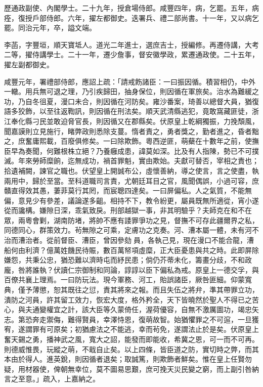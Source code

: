 \begin{pinyinscope}
歷通政副使、內閣學士。二十九年，授倉場侍郎。咸豐四年，病，乞罷。五年，病痊，復授戶部侍郎。六年，擢左都御史。迭署兵、禮二部尚書。十一年，又以病乞罷。同治元年，卒，謚文端。

李菡，字豐垣，順天寶坻人。道光二年進士，選庶吉士，授編修。再遷侍講，大考二等，擢侍講學士。二十一年，遷少詹事，督安徽學政，累遷通政使。二十五年，擢左副都御史。

咸豐元年，署禮部侍郎，應詔上疏：「請戒飭諸臣：一曰振因循。積習相仍，中外一轍。用兵無可退之理，乃引疾歸田，抽身保位，則因循在軍旅矣。治水為難緩之功，乃自冬徂夏，漫口未合，則因循在河防矣。雍沙番案，琦善以總督大員，猶復語多狡飾，以至往返鞫訊，則因循在刑法矣。順天武清縣逃犯，竟敢窩藏匪徒，浙江奉化縣刁民並敢迫脅官長，則因循又在郡縣矣。伏原皇上乾綱獨振，力挽頹風，聞嘉謨則立見施行，睹弊政則悉除支蔓。惰者責之，勇者獎之，勤者進之，昏者黜之，庶奮庸熙載，百廢俱修矣。一曰除欺飾。粵西逆匪，萌蘗在十數年之前，使撫臣早為奏聞，何難根株立絕？乃養癰成患，諱莫如深。比及有人指陳，勢已不可撲滅。年來勞師糜餉，迄無成功，禍首罪魁，實由欺始。夫獻可替否，宰相之責也；拾遺補闕，諫官之職也。伏望皇上開誠布公，虛懷善納，導之使言，言之使盡，執兩用中，歸於至當。至科道職司言責，尤朝廷耳目之官，風聞偶誤，小過可容，庶贛直得效其愚，萋菲莫行其罔，而宸聰四達矣。一曰屏偏私。人之氣質，不能無偏，意見少有參差，議論遂多齟。相持不下，教令紛更，屬員既無所適從，宵小遂從而讒構。嫌隙日深，乖氣致戾。刑部越獄一事，非其明驗乎？夫師克在和不在眾，兩粵會剿，湖南防堵，將帥不應有諉罪爭功之見，督撫不可存此疆爾界之私，同德同心，群策效力。茍無隙之可乘，定膚功之克奏。河、漕本屬一體，未有河不治而漕治者。從前督臣、漕臣，曾因參劾員，各執己見，現在漫口不能合龍，漕船何由利濟？億萬姓饑民待賑，數百萬帑項虛糜，正大臣憂患與共之時。此即屏除嫌怨，共秉公忠，猶恐難以濟時屯而紓民患；倘仍芥蒂未化，籌畫分歧，不和政龐，咎將誰執？伏讀仁宗御制和同論，諄諄以臣下偏私為戒。原皇上一德交孚，與百僚共襄上理焉。一曰防玩法。現今軍務、河工，貽誤諸臣，厥咎匪細。仰蒙寬典，僅予薄懲，恕其既往之愆，責其將來之報。而且失伍之將弁，準其帶罪立功，潰防之河員，許其留工效力，恢宏大度，格外矜全，天下皆曉然於聖人不得已之苦心，與夫通變權宜之計，該大臣等久蒙倚任，渥荷優容，自無不激厲圖功，竭忠矢志。第恐奔走禦侮，難得賢員，幸澤恃恩，復萌故智。始猶懼罪之不可逭，一旦獲宥，遂謂罪有可原矣；初猶慮法之不能逃，幸而茍免，遂謂法止於是矣。伏原皇上奮天錫之勇，播神武之風，寬大之詔，能發而即能收，希冀之恩，可一而不可再。則德威惟畏，玩縱之萌，不戢自止矣。以上四條，皆臣道之防，實切時之弊，而其本由於得人。進英銳，則因循者退矣；取誠篤，則欺飾者鮮矣。惟在皇上任賢勿疑，用材器使，俾朝無幸位，莫不圖易思艱，庶可挽天災民變之窮，而上副引咎納言之至意。」疏入，上嘉納之。


\end{pinyinscope}
